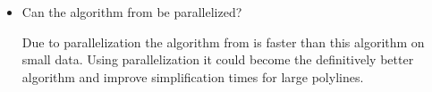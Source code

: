 \begin{itemize}
	\item Can the algorithm from \citeauthor{polyline_simplification_has_cubic_complexity_bringmannetal} be parallelized?

	Due to parallelization the algorithm from \citeauthor{on_optimal_polyline_simplification_using_the_hausdorff_and_frechet_distance} is faster than this algorithm on small data. Using parallelization it could become the definitively better algorithm and improve simplification times for large polylines.
\end{itemize}


